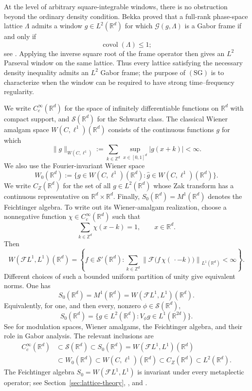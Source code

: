 \documentclass[11pt,reqno]{amsart}
\numberwithin{equation}{section}
\theoremstyle{definition}
\theoremstyle{remark}
\newcommand{\R}{\mathbb R}
\newcommand{\Z}{\mathbb Z}
\newcommand{\covol}{\operatorname{covol}}
\newcommand{\G}{\mathcal G}
\newcommand{\Sclass}{\mathcal S}
\newcommand{\norm}[1]{\lVert #1\rVert}
\newcommand{\SG}{\ensuremath{(\mathrm{SG})}\xspace}
\newcommand{\CZ}{C_Z}
\newcommand{\Szero}{S_0}
\newcommand{\Wiener}{W(C,\ell^1)}
\newcommand{\Wzero}{W_0}
\begin{document}
At the level of arbitrary square-integrable windows, there is no obstruction
beyond the ordinary density condition.  Bekka proved that a full-rank
phase-space lattice $\Lambda$ admits a window $g\in L^2(\R^d)$ for which
$\G(g,\Lambda)$ is a Gabor frame if and only if
\[
                         \covol(\Lambda)\le 1;
\]
see \cite[Theorem~4]{Bekka2004}.  Applying the inverse square root of the
frame operator then gives an $L^2$ Parseval window on the same lattice.
Thus every lattice satisfying the necessary density inequality admits an
$L^2$ Gabor frame; the purpose of \SG is to characterize when the window
can be required to have strong time--frequency regularity.

We write $C_c^\infty(\R^d)$ for the space of infinitely differentiable
functions on $\R^d$ with compact support, and $\Sclass(\R^d)$ for the
Schwartz class.  The classical Wiener amalgam space
$\Wiener(\R^d)$ consists of the continuous functions $g$ for which
\[
 \norm{g}_{\Wiener}
 :=\sum_{k\in\Z^d}\sup_{x\in[0,1]^d}|g(x+k)|<\infty.
\]
We also use the Fourier-invariant Wiener space
\[
 \Wzero(\R^d)
 :=\{g\in\Wiener(\R^d):\widehat g\in\Wiener(\R^d)\}.
\]
We write $\CZ(\R^d)$ for the set of all $g\in L^2(\R^d)$ whose Zak
transform has a continuous representative on $\R^d\times\R^d$.  Finally,
$\Szero(\R^d)=M^1(\R^d)$ denotes the Feichtinger algebra.  To write out its
Wiener-amalgam realization, choose a nonnegative function
$\chi\in C_c^\infty(\R^d)$ such that
\[
 \sum_{k\in\Z^d}\chi(x-k)=1,
 \qquad x\in\R^d.
\]
Then
\begin{equation}\label{eq:FL1L1-definition}
 W(\mathcal F L^1,L^1)(\R^d)
 =\left\{f\in\mathcal S'(\R^d):
   \sum_{k\in\Z^d}
   \left\|\mathcal F\bigl(f\,\chi(\,\cdot-k)\bigr)\right\|_{L^1(\R^d)}<\infty
  \right\}.
\end{equation}
Different choices of such a bounded uniform partition of unity give
equivalent norms.  One has
\[
 \Szero(\R^d)=M^1(\R^d)=W(\mathcal F L^1,L^1)(\R^d).
\]
Equivalently, for one, and then every, nonzero
$\phi\in\Sclass(\R^d)$,
\[
 \Szero(\R^d)
 =\{g\in L^2(\R^d):V_\phi g\in L^1(\R^{2d})\}.
\]
See \cite[Chapters~11--13]{Grochenig2001} for modulation spaces, Wiener
amalgams, the Feichtinger algebra, and their role in Gabor analysis.  The relevant
inclusions are
\[
 \begin{aligned}
 C_c^\infty(\R^d)
 &\subset \Sclass(\R^d)
 \subset \Szero(\R^d)=W(\mathcal F L^1,L^1)(\R^d)\\
 &\subset \Wzero(\R^d)
 \subset \Wiener(\R^d)
 \subset \CZ(\R^d)
 \subset L^2(\R^d).
 \end{aligned}
\]
The Feichtinger algebra
$\Szero=W(\mathcal F L^1,L^1)$ is invariant under every metaplectic
operator; see Section~\ref{sec:lattice-theory},
\cite[Section~9.4]{Grochenig2001}, and \cite{GjertsenLuef2024}.
\end{document}
